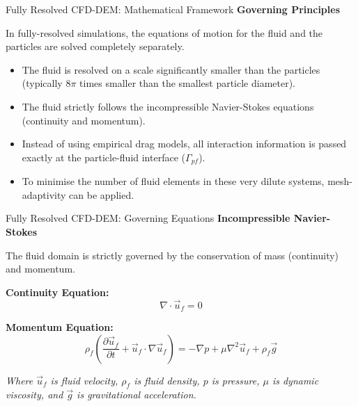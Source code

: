 \begin{frame}{Fully Resolved CFD-DEM: Mathematical Framework}
    \textbf{Governing Principles}
    \vspace{0.3cm}
    
    In fully-resolved simulations, the equations of motion for the fluid and the particles are solved completely separately.
    
    \begin{itemize}
        \item The fluid is resolved on a scale significantly smaller than the particles (typically $8\pi$ times smaller than the smallest particle diameter).
        \item The fluid strictly follows the incompressible Navier-Stokes equations (continuity and momentum).
        \item Instead of using empirical drag models, all interaction information is passed exactly at the particle-fluid interface ($\Gamma_{pf}$).
        \item To minimise the number of fluid elements in these very dilute systems, mesh-adaptivity can be applied.
    \end{itemize}
\end{frame}

\begin{frame}{Fully Resolved CFD-DEM: Governing Equations}
    \textbf{Incompressible Navier-Stokes}
    \vspace{0.3cm}
    
    The fluid domain is strictly governed by the conservation of mass (continuity) and momentum.
    
    \vspace{0.2cm}
    \textbf{Continuity Equation:}
    $$ \nabla \cdot \vec{u}_{f} = 0 $$
    
    \vspace{0.2cm}
    \textbf{Momentum Equation:}
    $$ \rho_{f} \left( \frac{\partial \vec{u}_{f}}{\partial t} + \vec{u}_{f} \cdot \nabla \vec{u}_{f} \right) = -\nabla p + \mu \nabla^2 \vec{u}_{f} + \rho_{f} \vec{g} $$
    
    \vspace{0.3cm}
    \small{\textit{Where $\vec{u}_{f}$ is fluid velocity, $\rho_{f}$ is fluid density, $p$ is pressure, $\mu$ is dynamic viscosity, and $\vec{g}$ is gravitational acceleration.}}
\end{frame}

